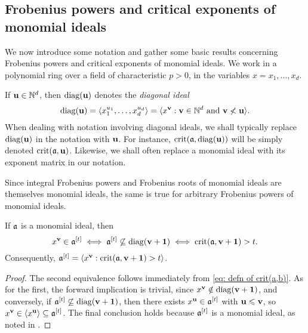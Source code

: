 \documentclass[11pt]{amsart}
\begin{document}
\subsection{Frobenius powers and critical exponents of monomial ideals}

We now introduce some notation and gather some basic results concerning Frobenius powers and critical exponents of monomial ideals.
We work in a polynomial ring over a field of characteristic $p>0$, in the variables $x=x_1,\ldots,x_d$.

\begin{notation}
   If $\mathbf{u}\in \mathbb{N}^d$, then $\operatorname{diag}(\mathbf{u})$ denotes the \emph{diagonal ideal}
   \[ \operatorname{diag}(\mathbf{u}) = \langle x_1^{u_1},\ldots,x_d^{u_d} \rangle = \langle x^{\mathbf{v}} : \mathbf{v} \in \mathbb{N}^d \text{ and } \mathbf{v} \not < \mathbf{u} \rangle.\]
   When dealing with notation involving diagonal ideals, we shall typically replace $\operatorname{diag}(\mathbf{u})$ in the notation with $\mathbf{u}$.
   For instance, $\operatorname{crit}(\mathfrak{a},\operatorname{diag}(\mathbf{u}))$ will be simply denoted $\operatorname{crit}(\mathfrak{a},\mathbf{u})$.
   Likewise, we shall often replace a monomial ideal with its exponent matrix in our notation.
\end{notation}

\begin{remark}\label{rmk: Frobenius powers of monomial ideals are monomial ideals}
   Since integral Frobenius powers and Frobenius roots of monomial ideals are themselves monomial ideals, the same is true for arbitrary Frobenius powers of monomial ideals.
\end{remark}

\begin{proposition}\label{prop: description of frobenius powers in terms of crits}
   If $\mathfrak{a}$ is a monomial ideal, then
   \[ x^{\mathbf{v}} \in \mathfrak{a}^{[t]} \iff \mathfrak{a}^{[t]} \not \subseteq \operatorname{diag}(\mathbf{v}+\mathbf{1}) \iff \operatorname{crit}(\mathfrak{a}, \mathbf{v}+\mathbf{1}) > t.\]
   Consequently, $\mathfrak{a}^{[t]} = \langle x^{\mathbf{v}} : \operatorname{crit}(\mathfrak{a}, \mathbf{v}+\mathbf{1}) > t \rangle$.
\end{proposition}

\begin{proof}
   The second equivalence follows immediately from \eqref{eq: defn of crit(a,b)}.
   As for the first, the forward implication is trivial, since $x^{\mathbf{v}} \notin\operatorname{diag}(\mathbf{v}+\mathbf{1})$, and conversely, if $\mathfrak{a}^{[t]} \not \subseteq \operatorname{diag}(\mathbf{v}+\mathbf{1})$, then there exists $x^{\mathbf{u}} \in \mathfrak{a}^{[t]}$ with $\mathbf{u} \leqslant \mathbf{v}$, so $x^{\mathbf{v}}\in \langle x^{\mathbf{u}} \rangle \subseteq \mathfrak{a}^{[t]}$.
   The final conclusion holds because $\mathfrak{a}^{[t]}$ is a monomial ideal, as noted in .
\end{proof}
\end{document}
